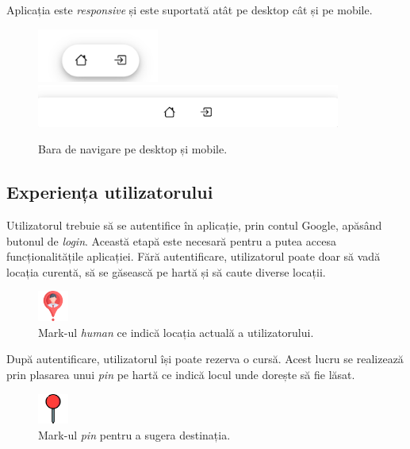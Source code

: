 Aplicația este \textit{responsive} și este suportată atât pe desktop cât și pe mobile.

\begin{figure}[H]
    \centering
    \includegraphics[width=4cm]{Assets/responsive1.png}
    \includegraphics[width=10cm]{Assets/responsive2.png}
    \caption{Bara de navigare pe desktop și mobile.}
    \label{fig:responsive}
\end{figure}

\subsection{Experiența utilizatorului}

Utilizatorul trebuie să se autentifice în aplicație, prin contul Google, apăsând butonul de \textit{login}. 
Această etapă este necesară pentru a putea accesa funcționalitățile aplicației.
Fără autentificare, utilizatorul poate doar să vadă locația curentă, să se găsească pe hartă și să
caute diverse locații.

\begin{figure}[H]
    \centering
    \includegraphics[width=1cm]{Assets/human.png}
    \caption{Mark-ul \textit{human} ce indică locația actuală a utilizatorului.}
    \label{fig:humanMark}
\end{figure}

După autentificare, utilizatorul își poate rezerva o cursă. Acest lucru se realizează prin
plasarea unui \textit{pin} pe hartă ce indică locul unde dorește să fie lăsat.

\begin{figure}[H]
    \centering
    \includegraphics[width=1cm]{Assets/pin.png}
    \caption{Mark-ul \textit{pin} pentru a sugera destinația.}
    \label{fig:pinMark}
\end{figure}

